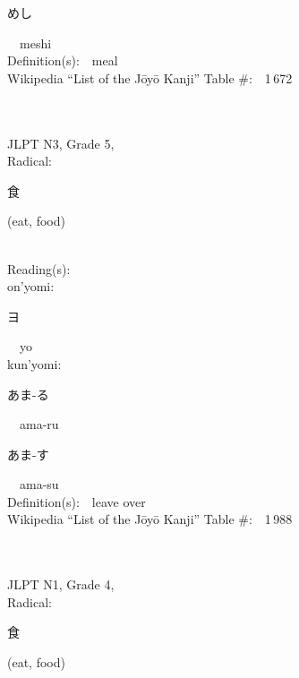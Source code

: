 \begin{multicols}{2}
{\hspace*{2em}}{\begin{CJK}{UTF8}{min} めし \end{CJK}}\ \ meshi\ \ \\
Definition(s):\ \ meal \\
Wikipedia ``List of the J\=oy\=o Kanji'' Table \#:\ \ 1\,672 \\
\ \ \\
{\fontsize{34pt}{40pt}  }\ \ \\  %
{JLPT N3, Grade 5, \\Radical:\ \ {\begin{CJK}{UTF8}{min} 食 \end{CJK}} (eat, food) } \\
Reading(s):\ \ \\
{\hspace*{1em}}on'yomi:\ \ \\
{\hspace*{2em}}{\begin{CJK}{UTF8}{min} ヨ \end{CJK}}\ \ yo\ \ \\
{\hspace*{1em}}kun'yomi:\ \ \\
{\hspace*{2em}}{\begin{CJK}{UTF8}{min} あま-る \end{CJK}}\ \ ama-ru\ \ \\
{\hspace*{2em}}{\begin{CJK}{UTF8}{min} あま-す \end{CJK}}\ \ ama-su\ \ \\
Definition(s):\ \ leave over \\
Wikipedia ``List of the J\=oy\=o Kanji'' Table \#:\ \ 1\,988 \\
\ \ \\
{\fontsize{34pt}{40pt}  }\ \ \\  %
{JLPT N1, Grade 4, \\Radical:\ \ {\begin{CJK}{UTF8}{min} 食 \end{CJK}} (eat, food) } \\

\end{multicols}
